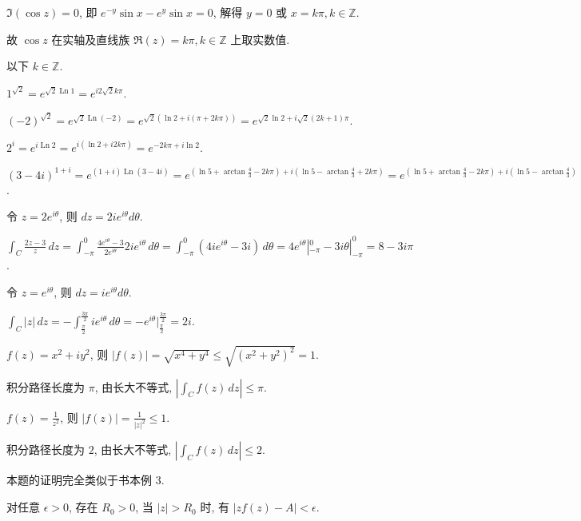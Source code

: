 \documentclass{homework}
\DeclareMathOperator\Ln{Ln}
\begin{document}
\(\Im(\cos z)=0\), 即 \(e^{-y}\sin x-e^y\sin x=0\), 解得 \(y=0\) 或 \(x=k\pi, k\in\mathbb{Z}\).

故 \(\cos z\) 在实轴及直线族 \(\Re(z)=k\pi, k\in\mathbb{Z}\) 上取实数值.

以下 \(k\in\mathbb{Z}\).

\(1^{\sqrt{2}}=e^{\sqrt{2}\Ln 1}=e^{i2\sqrt{2}k\pi}\).

\((-2)^{\sqrt{2}}=e^{\sqrt{2}\Ln(-2)}=e^{\sqrt{2}(\ln 2+i(\pi+2k\pi))}=e^{\sqrt{2}\ln 2+i\sqrt{2}(2k+1)\pi}\).

\(2^i=e^{i\Ln 2}=e^{i(\ln 2+i2k\pi)}=e^{-2k\pi+i\ln 2}\).

\((3-4i)^{1+i}=e^{(1+i)\Ln(3-4i)}=e^{(\ln 5+\arctan\frac{4}{3}-2k\pi)+i(\ln 5-\arctan\frac{4}{3}+2k\pi)}=e^{(\ln 5+\arctan\frac{4}{3}-2k\pi)+i(\ln 5-\arctan\frac{4}{3})}\).


\begin{center}
\end{center}

令 \(z=2e^{i\theta}\), 则 \(dz=2ie^{i\theta}d\theta\).

\(\int_C\frac{2z-3}{z}\,dz=\int_{-\pi}^{0}\frac{4e^{i\theta}-3}{2e^{i\theta}}2ie^{i\theta}\,d\theta=\int_{-\pi}^{0}(4ie^{i\theta}-3i)\,d\theta=4e^{i\theta}|_{-\pi}^{0}-3i\theta|_{-\pi}^{0}=8-3i\pi\).

令 \(z=e^{i\theta}\), 则 \(dz=ie^{i\theta}d\theta\).

\(\int_C|z|\,dz=-\int_{\frac{\pi}{2}}^{\frac{3\pi}{2}}ie^{i\theta}\,d\theta=-e^{i\theta}|_{\frac{\pi}{2}}^{\frac{3\pi}{2}}=2i\).

\(f(z)=x^2+iy^2\), 则 \(|f(z)|=\sqrt{x^4+y^4}\leq\sqrt{(x^2+y^2)^2}=1\).

积分路径长度为 \(\pi\), 由长大不等式, \(|\int_Cf(z)\,dz|\leq\pi\).

\(f(z)=\frac{1}{z^2}\), 则 \(|f(z)|=\frac{1}{|z|^2}\leq1\).

积分路径长度为 \(2\), 由长大不等式, \(|\int_Cf(z)\,dz|\leq2\).

本题的证明完全类似于书本例 3.

对任意 \(\epsilon>0\), 存在 \(R_0>0\), 当 \(|z|>R_0\) 时, 有 \(|zf(z)-A|<\epsilon\).
\end{document}
